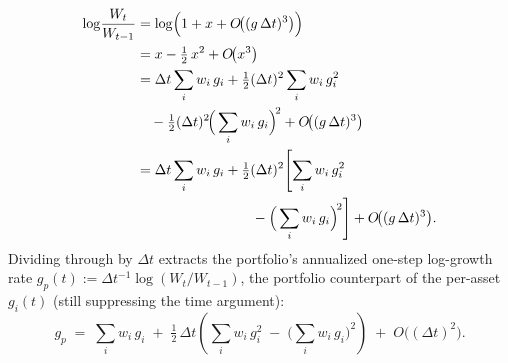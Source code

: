 \begin{align}
  \log\!\frac{W_t}{W_{t-1}}
   &= \log\!\Big(1 + x + O\!\big((g\,\Delta t)^3\big)\Big) \notag \\
   &= x - \tfrac{1}{2}\, x^2 + O\!\big(x^3\big) \notag \\
   &= \Delta t \sum_{i} w_i\, g_i
        + \tfrac{1}{2}(\Delta t)^2 \sum_{i} w_i\, g_i^2
        \notag \\
   &\quad - \tfrac{1}{2}(\Delta t)^2
        \!\Big(\sum_{i} w_i\, g_i\Big)^{\!2}
        + O\!\big((g\,\Delta t)^3\big) \notag \\
   &= \Delta t \sum_{i} w_i\, g_i
        + \tfrac{1}{2}(\Delta t)^2 \!\left[\sum_{i} w_i\, g_i^2
        \right. \notag \\
   &\hspace{8em}\left.{}- \Big(\sum_{i} w_i\, g_i\Big)^{\!2}\right]
        + O\!\big((g\,\Delta t)^3\big).
  \label{eq:rp-taylor}
\end{align}
Dividing through by $\Delta t$ extracts the portfolio's annualized
one-step log-growth rate $g_p(t) := \Delta t^{-1}\log(W_t/W_{t-1})$,
the portfolio counterpart of the per-asset $g_i(t)$ (still
suppressing the time argument):
\begin{equation}
  g_p \;=\; \sum_{i} w_i\, g_i
   \;+\; \tfrac{1}{2}\,\Delta t \!\left(\sum_{i} w_i\, g_i^2
        \;-\; \Big(\sum_{i} w_i\, g_i\Big)^{\!2}\right)
   \;+\; O\!\big((\Delta t)^2\big).
  \label{eq:gp-onestep}
\end{equation}

